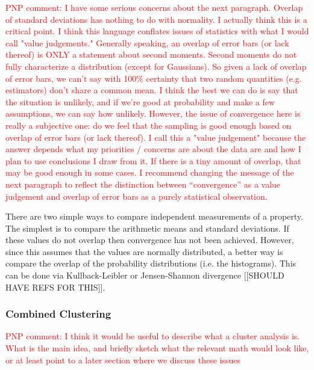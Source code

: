 \textcolor{red}{PNP comment: I have some serious concerns about the next paragraph.  Overlap of standard deviations has nothing to do with normality.  I actually think this is a critical point.  I think this language conflates issues of statistics with what I would call "value judgements."  Generally speaking, an overlap of error bars (or lack thereof) is ONLY a statement about second moments.  Second moments do not fully characterize a distribution (except for Gaussians).  So given a lack of overlap of error bars, we can't say with 100\% certainty that two random quantities (e.g. estimators) don't share a common mean.  I think the best we can do is say that the situation is unlikely, and if we're good at probability and make a few assumptions, we can say how unlikely.  However, the issue of convergence here is really a subjective one: do we feel that the sampling is good enough based on overlap of error bars (or lack thereof).  I call this a "value judgement" because the answer depends what my priorities / concerns are about the data are and how I plan to use conclusions I draw from it.  If there is a tiny amount of overlap, that may be good enough in some cases.  I recommend changing the message of the next paragraph to reflect the distinction between ``convergence'' as a value judgement and overlap of error bars as a purely statistical observation.}

There are two simple ways to compare independent measurements of a property. The simplest is to compare the arithmetic means and standard deviations. If these values do not overlap then convergence has not been achieved. However, since this assumes that the values are normally distributed, a better way is compare the overlap of the probability distributions (i.e. the histograms). This can be done via Kullback-Leibler or Jensen-Shannon divergence {\color{red}[[SHOULD HAVE REFS FOR THIS]]}.

\subsubsection*{Combined Clustering}

\textcolor{red}{PNP comment: I think it would be useful to describe what a cluster analysis is.  What is the main idea, and briefly sketch what the relevant math would look like, or at least point to a later section where we discuss these issues}

